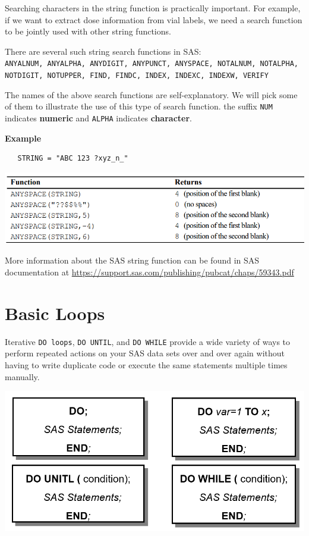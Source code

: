 \documentclass[
]{book}
\begin{document}
Searching characters in the string function is practically important. For example, if we want to extract dose information from vial labels, we need a search function to be jointly used with other string functions.

There are several such string search functions in SAS:
\texttt{ANYALNUM,\ ANYALPHA,\ ANYDIGIT,\ ANYPUNCT,\ ANYSPACE,\ NOTALNUM,\ NOTALPHA,\ NOTDIGIT,\ NOTUPPER,\ FIND,\ FINDC,\ INDEX,\ INDEXC,\ INDEXW,\ VERIFY}

The names of the above search functions are self-explanatory. We will pick some of them to illustrate the use of this type of search function. the suffix \texttt{NUM} indicates \textbf{numeric} and \texttt{ALPHA} indicates \textbf{character}.

\textbf{Example}

\begin{verbatim}
   STRING = "ABC 123 ?xyz_n_" 
\end{verbatim}

\begin{center}\includegraphics[width=1\linewidth]{img10/w10-ANYSearchFunction} \end{center}

More information about the SAS string function can be found in SAS documentation at \url{https://support.sas.com/publishing/pubcat/chaps/59343.pdf}

\hypertarget{basic-loops}{%
\section{Basic Loops}\label{basic-loops}}

Iterative \texttt{DO\ loops}, \texttt{DO\ UNTIL}, and \texttt{DO\ WHILE} provide a wide variety of ways to perform repeated actions on your SAS data sets over and over again without having to write duplicate code or execute the same statements multiple times manually.

\begin{center}\includegraphics[width=1\linewidth]{img10/w10-SASloops} \end{center}
\end{document}
